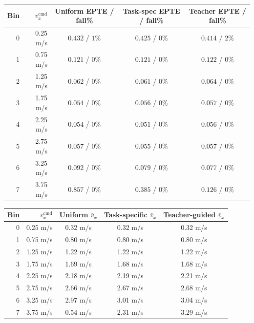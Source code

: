 \documentclass[a4paper,11pt]{article}
\begin{document}
    \begin{center}
    \begin{tabular}{@{}r r c c c@{}}
    \toprule
    \textbf{Bin} & $v_x^{\mathrm{cmd}}$ & \textbf{Uniform EPTE / fall\%} & \textbf{Task-spec EPTE / fall\%} & \textbf{Teacher EPTE / fall\%} \\
    \midrule
    0 & 0.25 m/s & $0.432$ / $1\%$ & $0.425$ / $0\%$ & $0.414$ / $2\%$ \\
    1 & 0.75 m/s & $0.121$ / $0\%$ & $0.121$ / $0\%$ & $0.122$ / $0\%$ \\
    2 & 1.25 m/s & $0.062$ / $0\%$ & $0.061$ / $0\%$ & $0.064$ / $0\%$ \\
    3 & 1.75 m/s & $0.054$ / $0\%$ & $0.056$ / $0\%$ & $0.057$ / $0\%$ \\
    4 & 2.25 m/s & $0.054$ / $0\%$ & $0.051$ / $0\%$ & $0.056$ / $0\%$ \\
    5 & 2.75 m/s & $0.057$ / $0\%$ & $0.055$ / $0\%$ & $0.057$ / $0\%$ \\
    6 & 3.25 m/s & $0.092$ / $0\%$ & $0.079$ / $0\%$ & $0.077$ / $0\%$ \\
    7 & 3.75 m/s & $0.857$ / $0\%$ & $0.385$ / $0\%$ & $0.126$ / $0\%$ \\
    \bottomrule
    \end{tabular}
    \label{tab:phase2_epte}
    \end{center}

    \begin{center}
    \begin{tabular}{@{}r r c c c@{}}
    \toprule
    \textbf{Bin} & $v_x^{\mathrm{cmd}}$ & \textbf{Uniform} $\bar v_x$ & \textbf{Task-specific} $\bar v_x$ & \textbf{Teacher-guided} $\bar v_x$ \\
    \midrule
    0 & 0.25 m/s & 0.32 m/s & 0.32 m/s & 0.32 m/s \\
    1 & 0.75 m/s & 0.80 m/s & 0.80 m/s & 0.80 m/s \\
    2 & 1.25 m/s & 1.22 m/s & 1.22 m/s & 1.22 m/s \\
    3 & 1.75 m/s & 1.69 m/s & 1.68 m/s & 1.68 m/s \\
    4 & 2.25 m/s & 2.18 m/s & 2.19 m/s & 2.21 m/s \\
    5 & 2.75 m/s & 2.66 m/s & 2.67 m/s & 2.68 m/s \\
    6 & 3.25 m/s & 2.97 m/s & 3.01 m/s & 3.04 m/s \\
    7 & 3.75 m/s & 0.54 m/s & 2.31 m/s & 3.29 m/s \\
    \bottomrule
    \end{tabular}
    \label{tab:phase2_vvscmd}
    \end{center}
\end{document}
